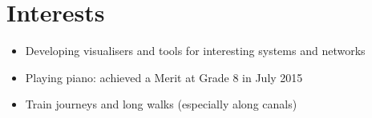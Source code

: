 \section*{Interests}
\stroke

\begin{itemize}[noitemsep]
    \item Developing visualisers and tools for interesting systems and networks
    \item Playing piano: achieved a Merit at Grade 8 in July 2015
    \item Train journeys and long walks (especially along canals)
\end{itemize}